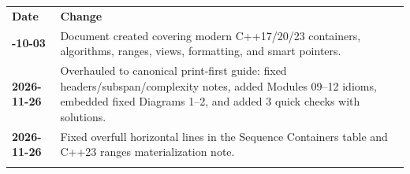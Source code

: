 \documentclass[11pt,a4paper]{article}
\begin{document}
\begin{center}
\begingroup
\small
{}
\begin{tabularx}{\textwidth}{>{\bfseries}l >{\raggedright\arraybackslash}X}
\arrayrulecolor{primaryblue}\toprule[1.2pt]
\rowcolor{primaryblue!10}
\textcolor{primaryblue}{\textbf{Date}} & \textcolor{primaryblue}{\textbf{Change}} \\
\arrayrulecolor{codeframe}\midrule[0.6pt]
2026-10-03 & Document created covering modern C++17/20/23 containers, algorithms, ranges, views, formatting, and smart pointers. \\
2026-11-26 & Overhauled to canonical print-first guide: fixed headers/subspan/complexity notes, added Modules 09--12 idioms, embedded fixed Diagrams 1--2, and added 3 quick checks with solutions. \\
2026-11-26 & Fixed overfull horizontal lines in the Sequence Containers table and C++23 ranges materialization note. \\
\arrayrulecolor{primaryblue}\bottomrule[1.2pt]
\end{tabularx}
\endgroup
\end{center}
\end{document}
